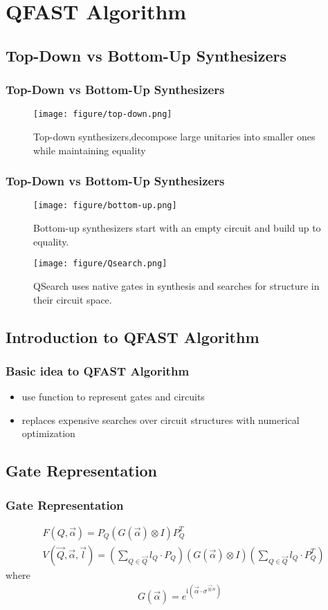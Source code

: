 \section{QFAST Algorithm}

\subsection{Top-Down vs Bottom-Up Synthesizers}
\begin{frame}
\frametitle{Top-Down vs Bottom-Up Synthesizers}
\begin{figure}
  \texttt{[image: figure/top-down.png]}
  \caption{Top-down synthesizers,decompose large unitaries into smaller ones while maintaining equality}
\end{figure}
\end{frame}
\begin{frame}
  \frametitle{Top-Down vs Bottom-Up Synthesizers}
  \begin{figure}
    \texttt{[image: figure/bottom-up.png]}
    \caption{Bottom-up synthesizers start with an empty circuit and build up to equality.}
  \end{figure}
  \begin{figure}
    \texttt{[image: figure/Qsearch.png]}
    \caption{QSearch uses native gates in synthesis and searches for structure in their circuit space.}
  \end{figure}
\end{frame}
\subsection{Introduction to QFAST Algorithm}
\begin{frame}
\frametitle{Basic idea to QFAST Algorithm}
\begin{itemize}
  \item use function to represent gates and circuits
  \item replaces expensive searches over circuit structures with numerical optimization
\end{itemize}
\end{frame}

\subsection{Gate Representation}
\begin{frame}
\frametitle{Gate Representation}

\begin{align}
  &F(Q, \vec{\alpha})=P_{Q}(G(\vec{\alpha}) \otimes I) P_{Q}^{T}\\
  &V(\vec{Q}, \vec{\alpha}, \vec{l})=\left(\sum_{Q \in \vec{Q}} l_{Q} \cdot P_{Q}\right)(G(\vec{\alpha}) \otimes I)\left(\sum_{Q \in \vec{Q}} l_{Q} \cdot P_{Q}^{T}\right)
\end{align}
where
\begin{align}
  G(\vec{\alpha})=e^{\mathrm{i}\left(\vec{\alpha} \cdot \sigma^{\vec{\otimes} n}\right)}
\end{align}
\end{frame}

